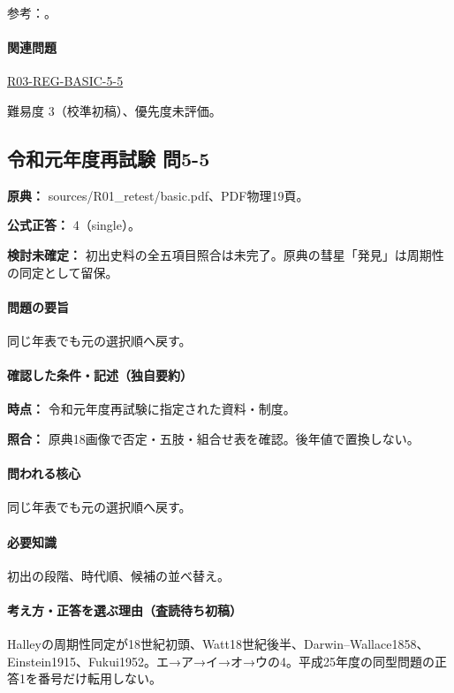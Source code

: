 \par 参考：\cite{env58_steam}。

\paragraph{関連問題} \hyperref[q:r03-reg-basic-5-5]{R03-REG-BASIC-5-5}

\par 難易度 3（校準初稿）、優先度未評価。

\subsection{令和元年度再試験 問5-5}
\label{q:r01-ret-basic-5-5}

\noindent\textbf{原典：} sources/R01\_retest/basic.pdf、PDF物理19頁。

\textbf{公式正答：} 4（single）。

\par\textbf{検討未確定：} 初出史料の全五項目照合は未完了。原典の彗星「発見」は周期性の同定として留保。

\paragraph{問題の要旨} 同じ年表でも元の選択順へ戻す。

\paragraph{確認した条件・記述（独自要約）}\mbox{}\par

\noindent\textbf{時点：} 令和元年度再試験に指定された資料・制度。\par

\noindent\textbf{照合：} 原典18画像で否定・五肢・組合せ表を確認。後年値で置換しない。\par

\paragraph{問われる核心} 同じ年表でも元の選択順へ戻す。

\paragraph{必要知識} 初出の段階、時代順、候補の並べ替え。

\paragraph{考え方・正答を選ぶ理由（査読待ち初稿）} Halleyの周期性同定が18世紀初頭、Watt18世紀後半、Darwin–Wallace1858、Einstein1915、Fukui1952。エ→ア→イ→オ→ウの4。平成25年度の同型問題の正答1を番号だけ転用しない。


